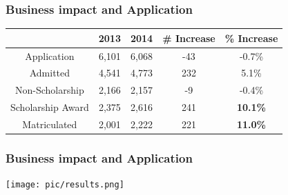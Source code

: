 \documentclass[aspectratio=169]{beamer}
\begin{document}
\begin{frame}
\frametitle{Business impact and Application}
  \begin{center}
    \begin{table}[H] 
\centering
\begin{tabular}{|c|c|c|c|c|}
\hline
& 2013 & 2014 & \# Increase & \% Increase \\ \hline
Application                    & 6,101 & 6,068 & -43         & -0.7\%      \\
\hline
Admitted                       & 4,541 & 4,773 & 232         & 5.1\%       \\
\hline
Non-Scholarship                & 2,166 & 2,157 & -9          & -0.4\%      \\
\hline
Scholarship Award              & 2,375 & 2,616 & 241     & \textbf{10.1\% }

\\
\hline
Matriculated                   & 2,001 & 2,222 & 221         & \textbf{11.0\%} 

\\
\hline
\end{tabular}
\end{table}
  \end{center}
\end{frame}




\begin{frame}
  \frametitle{Business impact and Application}
  \texttt{[image: pic/results.png]}

\end{frame}
\end{document}
